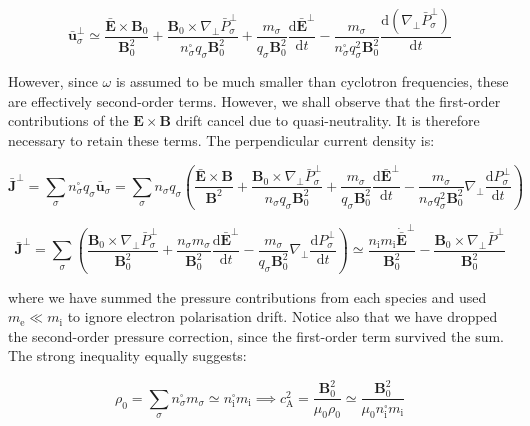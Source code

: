 \begin{equation}
    \bar{\mathbf{u}}_\sigma^\perp\simeq\frac{\bar{\mathbf{E}}\times\mathbf{B}_0}{\mathbf{B}_0^2}+\frac{\mathbf{B}_0\times\nabla_\perp\bar{P}_\sigma^\perp}{n_\sigma^\square q_\sigma\mathbf{B}_0^2}+\frac{m_\sigma}{q_\sigma\mathbf{B}_0^2}\frac{\mathrm{d}\bar{\mathbf{E}}^\perp}{\mathrm{d}t}-\frac{m_\sigma}{n_\sigma^\square q_\sigma^2\mathbf{B}_0^2}\frac{\mathrm{d}(\nabla_\perp\bar{P}_\sigma^\perp)}{\mathrm{d}t}
\end{equation}

However, since $\omega$ is assumed to be much smaller than cyclotron frequencies, these are effectively second-order terms. However, we shall observe that the first-order contributions of the $\mathbf{E}\times\mathbf{B}$ drift cancel due to quasi-neutrality. It is therefore necessary to retain these terms. The perpendicular current density is:

\begin{equation}
    \bar{\mathbf{J}}^\perp=\sum_\sigma n_\sigma^\square q_\sigma\bar{\mathbf{u}}_\sigma=\sum_{\sigma}n_\sigma q_\sigma\left(\frac{\bar{\mathbf{E}}\times\mathbf{B}}{\mathbf{B}^2}+\frac{\mathbf{B}_0\times\nabla_\perp\bar{P}_\sigma^\perp}{n_\sigma q_\sigma\mathbf{B}_0^2}+\frac{m_\sigma}{q_\sigma\mathbf{B}_0^2}\frac{\mathrm{d}\bar{\mathbf{E}}^\perp}{\mathrm{d}t}-\frac{m_\sigma}{n_\sigma q_\sigma^2\mathbf{B}_0^2}\nabla_\perp\frac{\mathrm{d}P_\sigma^\perp}{\mathrm{d}t}\right)
\end{equation}

\begin{equation}
    \label{eq-4-61}
    \bar{\mathbf{J}}^\perp=\sum_{\sigma}\left(\frac{\mathbf{B}_0\times\nabla_\perp\bar{P}_\sigma^\perp}{\mathbf{B}_0^2}+\frac{n_\sigma m_\sigma}{\mathbf{B}_0^2}\frac{\mathrm{d}\bar{\mathbf{E}}^\perp}{\mathrm{d}t}-\frac{m_\sigma}{q_\sigma\mathbf{B}_0^2}\nabla_\perp\frac{\mathrm{d}P_\sigma^\perp}{\mathrm{d}t}\right)\simeq\frac{n_\mathrm{i}m_\mathrm{i}\dot{\bar{\mathbf{E}}}^\perp}{\mathbf{B}_0^2}-\frac{\mathbf{B}_0\times\nabla_\perp\bar{P}^\perp}{\mathbf{B}_0^2}
\end{equation}

where we have summed the pressure contributions from each species and used $m_\text{e}\ll m_\mathrm{i}$ to ignore electron polarisation drift. Notice also that we have dropped the second-order pressure correction, since the first-order term survived the sum. The strong inequality equally suggests:

\begin{equation}
    \rho_0=\sum_\sigma n_\sigma^\square m_\sigma\simeq n_\mathrm{i}^\square m_\mathrm{i}\implies c_\text{A}^2=\frac{\mathbf{B}_0^2}{\mu_0\rho_0}\simeq\frac{\mathbf{B}_0^2}{\mu_0n_\mathrm{i}^\square m_\mathrm{i}}
\end{equation}

